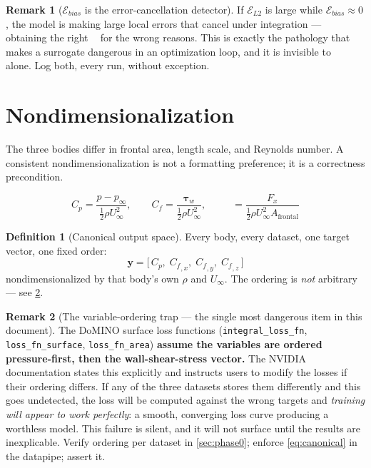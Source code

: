 \documentclass[10pt,a4paper]{article}
\theoremstyle{definition}
\newtheorem{definition}{Definition}[section]
\newtheorem{remark}{Remark}[section]
\DeclareMathOperator{\Cd}{C_d}
\newcommand{\Cp}{{C_p}}
\newcommand{\Cf}{{C_f}}
\begin{document}
\begin{remark}[$\mathcal{E}_{bias}$ is the error-cancellation detector]
\label{rem:cancel}
If $\mathcal{E}_{L2}$ is large while $\mathcal{E}_{bias} \approx 0$, the model is
making large local errors that cancel under integration --- obtaining the right
$\Cd$ for the wrong reasons. This is exactly the pathology that makes a surrogate
dangerous in an optimization loop, and it is invisible to $\Cd$ alone. Log both,
every run, without exception.
\end{remark}

\section{Nondimensionalization}
\label{sec:nondim}

The three bodies differ in frontal area, length scale, and Reynolds number. A
consistent nondimensionalization is not a formatting preference; it is a
correctness precondition.

\begin{equation}
\Cp = \frac{p - p_\infty}{\tfrac{1}{2}\rho U_\infty^2},
\qquad
\Cf = \frac{\boldsymbol{\tau}_w}{\tfrac{1}{2}\rho U_\infty^2},
\qquad
\Cd = \frac{F_x}{\tfrac{1}{2}\rho U_\infty^2 A_{\text{frontal}}}
\label{eq:nondim}
\end{equation}

\begin{definition}[Canonical output space]
\label{def:canonical}
Every body, every dataset, one target vector, one fixed order:
\begin{equation}
\boxed{\;
\mathbf{y} = \bigl[\, \Cp,\; \Cf_{,x},\; \Cf_{,y},\; \Cf_{,z} \,\bigr]
\;}
\label{eq:canonical}
\end{equation}
nondimensionalized by that body's own $\rho$ and $U_\infty$. The ordering is
\emph{not} arbitrary --- see \cref{rem:ordering}.
\end{definition}

\begin{remark}[The variable-ordering trap --- the single most dangerous item in this document]
\label{rem:ordering}
The DoMINO surface loss functions (\texttt{integral\_loss\_fn},
\texttt{loss\_fn\_surface}, \texttt{loss\_fn\_area}) \textbf{assume the variables
are ordered pressure-first, then the wall-shear-stress vector.} The NVIDIA
documentation states this explicitly and instructs users to modify the losses if
their ordering differs. If any of the three datasets stores them differently and
this goes undetected, the loss will be computed against the wrong targets and
\emph{training will appear to work perfectly}: a smooth, converging loss curve
producing a worthless model. This failure is silent, and it will not surface until
the results are inexplicable. Verify ordering per dataset in \cref{sec:phase0};
enforce \cref{eq:canonical} in the datapipe; assert it.
\end{remark}
\end{document}
